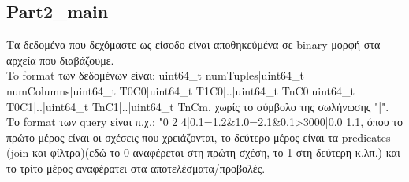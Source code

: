 \documentclass[12pt, a4paper]{article}
\begin{document}
\subsection{Part2\_main}
Τα δεδομένα που δεχόμαστε ως είσοδο είναι αποθηκεύμένα σε binary μορφή στα αρχεία που διαβάζουμε.\\
To format των δεδομένων είναι: uint64\_t numTuples|uint64\_t numColumns|uint64\_t T0C0|uint64\_t T1C0|..|uint64\_t TnC0|uint64\_t T0C1|..|uint64\_t TnC1|..|uint64\_t TnCm, χωρίς το σύμβολο της σωλήνωσης "|". \\
Το format των query είναι π.χ.: "0 2 4|0.1=1.2\&1.0=2.1\&0.1>3000|0.0 1.1, όπου το πρώτο μέρος είναι οι σχέσεις που χρειάζονται, το δεύτερο μέρος είναι τα predicates (join και φίλτρα)(εδώ το 0 αναφέρεται στη πρώτη σχέση, το 1 στη δεύτερη κ.λπ.) και το τρίτο μέρος αναφέρατει στα αποτελέσματα/προβολές.
\end{document}
